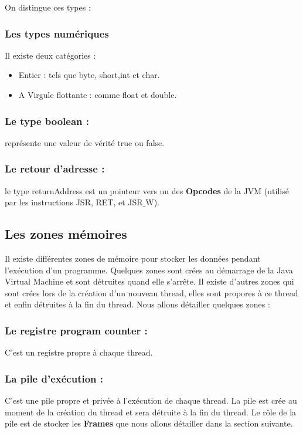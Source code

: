 \documentclass[12pt, a4paper, one side]{article}
\begin{document}
    On distingue ces types :
    \subsubsection{Les types numériques}
    Il existe deux catégories :
    \begin{itemize}
        \item Entier : tels que byte, short,int et char.
        \item A Virgule flottante : comme float et double.
    \end{itemize}

    \subsubsection{Le type boolean : } représente une valeur de vérité true ou false.
    \subsubsection{Le retour d'adresse : } le type returnAddress est un pointeur vers
    un des \textbf{Opcodes} de la JVM (utilisé par les instructions JSR, RET, et JSR$\_$W).

    \subsection{Les zones mémoires \cite{ref_zones_memeoire_java}}
    Il existe différentes zones de mémoire pour stocker les données pendant l'exécution d'un programme. Quelques zones sont crées au démarrage de la Java Virtual Machine et sont détruites quand elle s'arrête. Il existe d'autres zones qui sont crées lors de la création d'un nouveau thread, elles sont propores à ce thread et enfin détruites à la fin du thread.
    Nous allons détailler quelques zones :

    \subsubsection{Le registre program counter :} C'est un registre propre à chaque thread.

    \subsubsection{La pile d'exécution :} C'est une pile propre et privée à l'exécution de chaque thread. La pile est crée au moment de la création du thread et sera détruite à la fin du thread. Le rôle de la pile est de stocker les \textbf{Frames} que nous allons détailler dans la section suivante.
\end{document}
